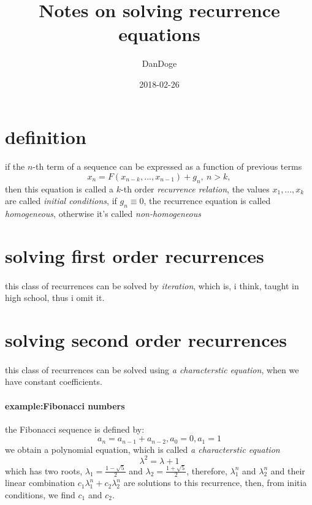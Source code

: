 \documentclass{article}
\title{Notes on solving recurrence equations}
\date{2018-02-26}
\author{DanDoge}
\begin{document}
\section{definition}
  \paragraph{}
    if the $n$-th term of a sequence can be expressed as a function of previous terms
    \begin{equation}
      x_n = F(x_{n - k}, ..., x_{n - 1}) + g_n,\ n > k,
    \end{equation}
    then this equation is called a $k$-th order \textit{recurrence relation}, the values $x_1, ..., x_k$ are called \textit{initial conditions}, if $g_n \equiv 0$, the recurrence equation is called \textit{homogeneous}, otherwise it's called \textit{non-homogeneous}
\section{solving first order recurrences}
  \paragraph{}
    this class of recurrences can be solved by \textit{iteration}, which is, i think, taught in high school, thus i omit it.
\section{solving second order recurrences}
  \paragraph{}
    this class of recurrences can be solved using \textit{a characterstic equation}, when we have constant coefficients.
  \paragraph{example:Fibonacci numbers}
    the Fibonacci sequence is defined by:
    \begin{equation}
      a_n = a_{n - 1} + a_{n - 2}, a_0 = 0, a_1 = 1
    \end{equation}
    we obtain a polynomial equation, which is called \textit{a characterstic equation}
    \begin{equation}
      \lambda^2 = \lambda + 1
    \end{equation}
    which has two roots, $\lambda_1 = \frac{1 - \sqrt{5}}{2}$ and $\lambda_2 = \frac{1 + \sqrt{5}}{2}$, therefore, $\lambda_1^n$ and $\lambda_2^n$ and their linear combination $c_1\lambda_1^n + c_2\lambda_2^n$ are solutions to this recurrence, then, from initia conditions, we find $c_1$ and $c_2$.
\end{document}
